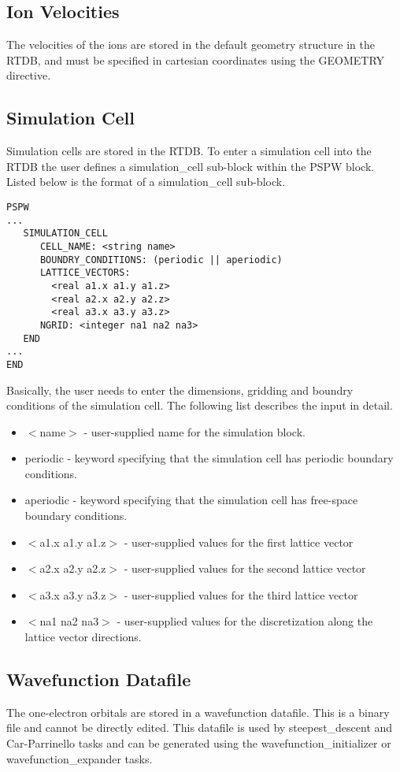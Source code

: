 \subsection{Ion Velocities}
The velocities of the ions are stored in the default geometry structure
in the RTDB, and must be specified in cartesian 
coordinates using the GEOMETRY directive.

\subsection{Simulation Cell}
Simulation cells are stored in the RTDB.  To enter a  simulation cell
into the RTDB the user defines a simulation\_cell sub-block within the PSPW 
block.  Listed below is the format of a simulation\_cell sub-block.
\begin{verbatim}
PSPW
...
   SIMULATION_CELL
      CELL_NAME: <string name>
      BOUNDRY_CONDITIONS: (periodic || aperiodic)
      LATTICE_VECTORS:
        <real a1.x a1.y a1.z>
        <real a2.x a2.y a2.z>
        <real a3.x a3.y a3.z>
      NGRID: <integer na1 na2 na3>
   END
...
END
\end{verbatim}
Basically, the user needs to enter the dimensions, gridding and boundry
conditions of the simulation cell.  The following list describes the 
input in detail.
\begin{itemize}
	\item $<$name$>$ - user-supplied name for the simulation block.
	\item periodic - keyword specifying that the simulation cell 
	                 has periodic boundary conditions. 	
	\item aperiodic - keyword specifying that the simulation cell
		          has free-space boundary conditions.
	\item $<$a1.x a1.y a1.z$>$ - user-supplied values for the first lattice 
				 vector 
	\item $<$a2.x a2.y a2.z$>$ - user-supplied values for the second lattice
				 vector
	\item $<$a3.x a3.y a3.z$>$ - user-supplied values for the third lattice
			  	 vector
	\item $<$na1 na2 na3$>$ - user-supplied values for the discretization along
			      the lattice vector directions.
\end{itemize}

\subsection{Wavefunction Datafile}
The one-electron orbitals are stored in a wavefunction datafile.  This
is a binary file and cannot be directly edited.  This datafile is used
by steepest\_descent and Car-Parrinello tasks and can be generated
using the wavefunction\_initializer or wavefunction\_expander tasks.

